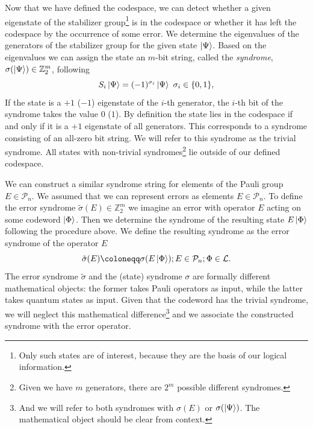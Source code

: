 Now that we have defined the codespace, we can detect whether a given eigenstate of the stabilizer group\footnote{
    Only such states are of interest, because they are the basis of our logical information. %
} is in the codespace or whether it has left the codespace by the occurrence of some error. 
We determine the eigenvalues of the generators of the stabilizer group for the given state $\ket{\Psi}$.
Based on the eigenvalues we can assign the state an $m$-bit string, called the \emph{syndrome}, $\sigma(\ket{\Psi}) \in \mathbb{Z}_2^m$, following 
\begin{equation}
    S_i \ket{\Psi} = (-1)^{\sigma_i} \ket{\Psi}\ \sigma_i \in \{0,1\},
    \label{eq:state_syndrome}
\end{equation}
If the state is a $+1$ ($-1$) eigenstate of the $i$-th generator, the $i$-th bit of the syndrome takes the value $0$ ($1$).
By definition the state lies in the codespace if and only if it is a $+1$ eigenstate of all generators.
This corresponds to a syndrome consisting of an all-zero bit string.
We will refer to this syndrome as the trivial syndrome.
All states with non-trivial syndromes\footnote{
    Given we have $m$ generators, there are $2^m$ possible different syndromes.
} lie outside of our defined codespace. 

We can construct a similar syndrome string for elements of the Pauli group $E\in \mathcal{P}_n$. 
We assumed that we can represent errors as elements $E\in \mathcal{P}_n$. 
To define the error syndrome $\tilde{\sigma}(E) \in \mathbb{Z}_2^m$ we imagine an error with operator $E$ acting on some codeword $\ket{\Phi}$.
Then we determine the syndrome of the resulting state $E\ket{\Phi}$ following the procedure above.
We define the resulting syndrome as the error syndrome of the operator $E$
\begin{equation}
    \tilde{\sigma}(E) \coloneqq \sigma(E\ket{\Phi}); E \in \mathcal{P}_n; \Phi \in \mathcal{L}.
    \label{eq:error_syndrome}
\end{equation}
The error syndrome  $\tilde{\sigma}$ and the (state) syndrome $\sigma$ are formally different mathematical objects: 
the former takes Pauli operators as input, while the latter takes quantum states as input.
Given that the codeword has the trivial syndrome, we will neglect this mathematical difference\footnote{
    And we will refer to both syndromes with $\sigma(E)$ or $\sigma(\ket{\Psi})$.
    The mathematical object should be clear from context.
    } and we associate the constructed syndrome with the error operator. 

